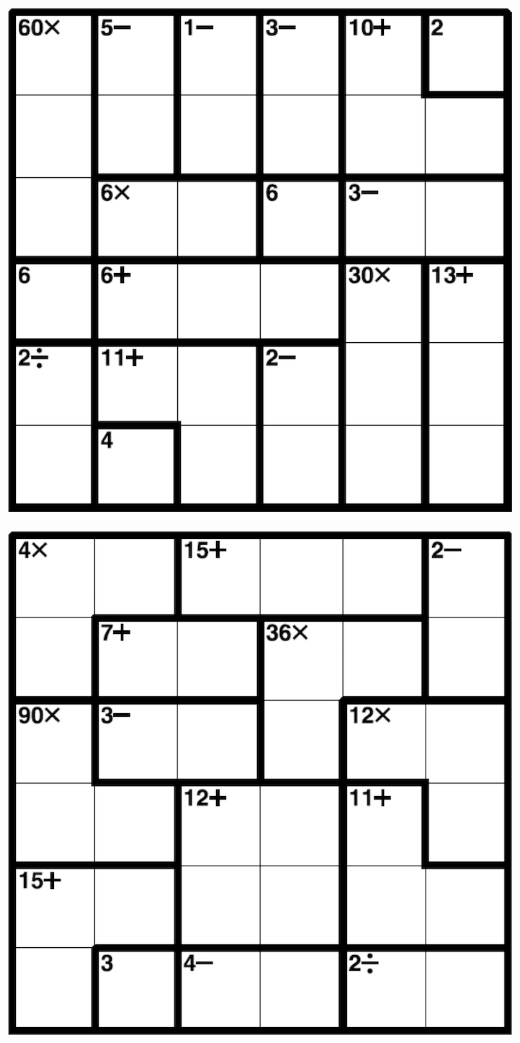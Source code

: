 
\includegraphics[scale=1]{Gambar/Lampiran/6x6_33.png}

\includegraphics[scale=1]{Gambar/Lampiran/6x6_34.png}
